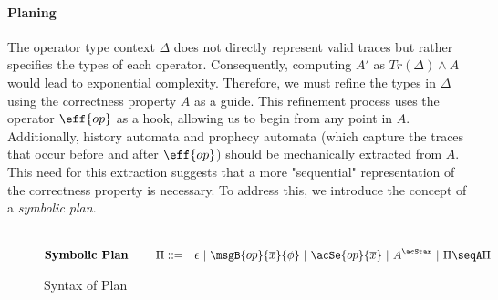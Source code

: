 \paragraph{Planing} The operator type context $\Delta$ does not directly represent valid traces but rather specifies the types of each operator. Consequently, computing $A'$ as $Tr(\Delta) \land A$ would lead to exponential complexity. Therefore, we must refine the types in $\Delta$ using the correctness property $A$ as a guide. This refinement process uses the operator $\eff{op}$ as a hook, allowing us to begin from any point in $A$. Additionally, history automata and prophecy automata (which capture the traces that occur before and after $\eff{op}$) should be mechanically extracted from $A$. This need for this extraction suggests that a more "sequential" representation of the correctness property is necessary. To address this, we introduce the concept of a \emph{symbolic plan}.

\begin{figure}[t!]
  \vspace{-.3cm}
{\footnotesize
{\small
  \begin{alignat*}{2}
    \\ \text{\textbf{Symbolic Plan }}& \quad  & \Pi ::= \quad & \epsilon ~|~ \msgB{op}{\overline{x}}{\phi} ~|~ \acSe{op}{\overline{x}} ~|~ A^\acStar ~|~ \Pi \seqA \Pi
  \end{alignat*}}
  }
\caption{Syntax of Plan}
\label{fig:plan-syntax}
\end{figure}

